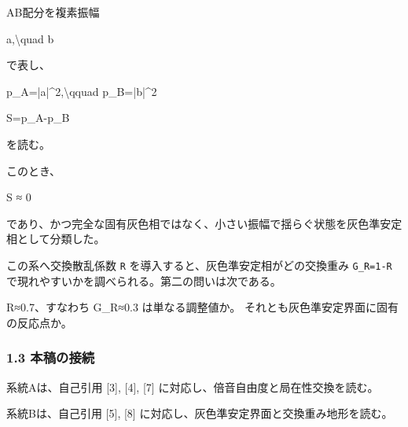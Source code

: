 \documentclass[
]{article}
\newenvironment{Shaded}{}{}
\newcommand{\NormalTok}[1]{#1}
\begin{document}
AB配分を複素振幅

\begin{Shaded}
\begin{Highlighting}[]
\NormalTok{a,\textbackslash{}quad b}
\end{Highlighting}
\end{Shaded}

で表し、

\begin{Shaded}
\begin{Highlighting}[]
\NormalTok{p\_A=|a|\^{}2,\textbackslash{}qquad p\_B=|b|\^{}2}
\end{Highlighting}
\end{Shaded}

\begin{Shaded}
\begin{Highlighting}[]
\NormalTok{S=p\_A{-}p\_B}
\end{Highlighting}
\end{Shaded}

を読む。

このとき、

\begin{Shaded}
\begin{Highlighting}[]
\NormalTok{S ≈ 0}
\end{Highlighting}
\end{Shaded}

であり、かつ完全な固有灰色相ではなく、小さい振幅で揺らぐ状態を灰色準安定相として分類した。

この系へ交換散乱係数 \texttt{R} を導入すると、灰色準安定相がどの交換重み
\texttt{G\_R=1-R} で現れやすいかを調べられる。第二の問いは次である。

\begin{Shaded}
\begin{Highlighting}[]
\NormalTok{R≈0.7、すなわち G\_R≈0.3 は単なる調整値か。}
\NormalTok{それとも灰色準安定界面に固有の反応点か。}
\end{Highlighting}
\end{Shaded}

\subsubsection{1.3 本稿の接続}\label{ux672cux7a3fux306eux63a5ux7d9a}

系統Aは、自己引用 {[}3{]}, {[}4{]}, {[}7{]}
に対応し、倍音自由度と局在性交換を読む。

系統Bは、自己引用 {[}5{]}, {[}8{]}
に対応し、灰色準安定界面と交換重み地形を読む。
\end{document}
